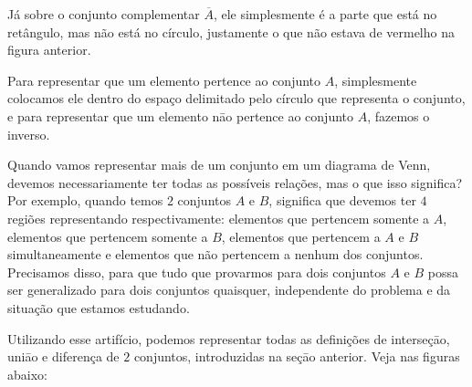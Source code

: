 Já sobre o conjunto complementar $\overline A$, ele simplesmente é a parte que está no retângulo, mas não está no círculo, justamente o que não estava de vermelho na figura anterior.


Para representar que um elemento pertence ao conjunto $A$, simplesmente colocamos ele dentro do espaço delimitado pelo círculo que representa o conjunto, e para representar que um elemento nāo pertence ao conjunto $A$, fazemos o inverso.



Quando vamos representar mais de um conjunto em um diagrama de Venn, devemos necessariamente ter todas as possíveis relações, mas o que isso significa? Por exemplo, quando temos $2$ conjuntos $A$ e $B$, significa que devemos ter $4$ regiões representando respectivamente: elementos que pertencem somente a $A$, elementos que pertencem somente a $B$, elementos que pertencem a $A$ e $B$ simultaneamente e elementos que não pertencem a nenhum dos conjuntos. Precisamos disso, para que tudo que provarmos para dois conjuntos $A$ e $B$ possa ser generalizado para dois conjuntos quaisquer, independente do problema e da situação que estamos estudando.

Utilizando esse artifício, podemos representar todas as definições de interseçāo, uniāo e diferença de $2$ conjuntos, introduzidas na seçāo anterior. Veja nas figuras abaixo:




